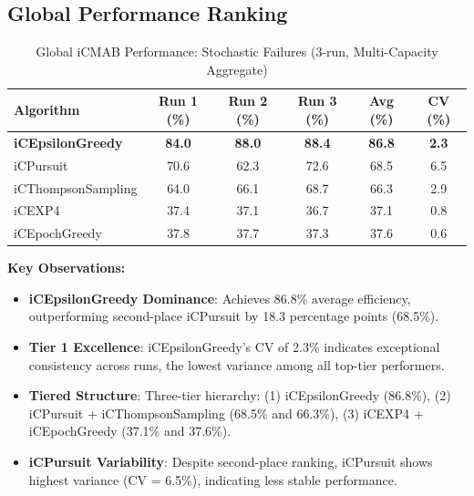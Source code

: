 \documentclass[12pt,a4paper]{article}
\newcommand{\primarytext}[1]{\textcolor{primaryblue}{\textbf{#1}}}
\newcommand{\secondarytext}[1]{\textcolor{secondaryblue}{\textbf{#1}}}
\newcommand{\warning}[1]{\textcolor{warningred}{\textbf{#1}}}
\begin{document}
\begin{tcolorbox}[colback=tableheader,colframe=primaryblue,title=\textbf{Primary iCMAB Performance Results (Stochastic Environment, Attack Rate: 0.25)}]

\subsection{Global Performance Ranking}

\begin{table}[H]
\centering
\caption{Global iCMAB Performance: Stochastic Failures (3-run, Multi-Capacity Aggregate)}
\label{tab:global-performance-stochastic}
\begin{tabular}{@{}lccccc@{}}
\toprule
\textbf{Algorithm} & \textbf{Run 1 (\%)} & \textbf{Run 2 (\%)} & \textbf{Run 3 (\%)} & \textbf{Avg (\%)} & \textbf{CV (\%)} \\
\midrule
\primarytext{iCEpsilonGreedy}   & \primarytext{84.0} & \primarytext{88.0} & \primarytext{88.4} & \primarytext{86.8} & \primarytext{2.3} \\
iCPursuit                       & 70.6 & 62.3 & 72.6 & 68.5 & 6.5 \\
iCThompsonSampling              & 64.0 & 66.1 & 68.7 & 66.3 & 2.9 \\
iCEXP4                          & 37.4 & 37.1 & 36.7 & 37.1 & 0.8 \\
iCEpochGreedy                   & 37.8 & 37.7 & 37.3 & 37.6 & 0.6 \\
\bottomrule
\end{tabular}
\end{table}

\textbf{Key Observations:}
\begin{itemize}
\item \primarytext{iCEpsilonGreedy Dominance}: Achieves 86.8\% average efficiency, outperforming second-place iCPursuit by 18.3 percentage points (68.5\%).
\item \primarytext{Tier 1 Excellence}: iCEpsilonGreedy's CV of 2.3\% indicates exceptional consistency across runs, the lowest variance among all top-tier performers.
\item \secondarytext{Tiered Structure}: Three-tier hierarchy: (1) iCEpsilonGreedy (86.8\%), (2) iCPursuit + iCThompsonSampling (68.5\% and 66.3\%), (3) iCEXP4 + iCEpochGreedy (37.1\% and 37.6\%).
\item \warning{iCPursuit Variability}: Despite second-place ranking, iCPursuit shows highest variance (CV = 6.5\%), indicating less stable performance.
\end{itemize}
\end{tcolorbox}
\end{document}
